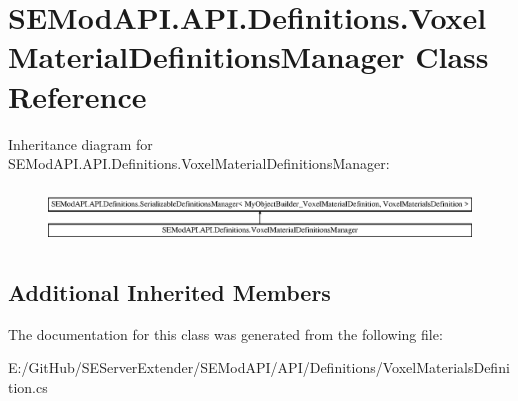 \hypertarget{class_s_e_mod_a_p_i_1_1_a_p_i_1_1_definitions_1_1_voxel_material_definitions_manager}{}\section{S\+E\+Mod\+A\+P\+I.\+A\+P\+I.\+Definitions.\+Voxel\+Material\+Definitions\+Manager Class Reference}
\label{class_s_e_mod_a_p_i_1_1_a_p_i_1_1_definitions_1_1_voxel_material_definitions_manager}
Inheritance diagram for S\+E\+Mod\+A\+P\+I.\+A\+P\+I.\+Definitions.\+Voxel\+Material\+Definitions\+Manager\+:\begin{figure}[H]
\begin{center}
\leavevmode
\includegraphics[height=1.491345cm]{class_s_e_mod_a_p_i_1_1_a_p_i_1_1_definitions_1_1_voxel_material_definitions_manager}
\end{center}
\end{figure}
\subsection*{Additional Inherited Members}


The documentation for this class was generated from the following file\+:\begin{DoxyCompactItemize}
\item 
E\+:/\+Git\+Hub/\+S\+E\+Server\+Extender/\+S\+E\+Mod\+A\+P\+I/\+A\+P\+I/\+Definitions/Voxel\+Materials\+Definition.\+cs\end{DoxyCompactItemize}
